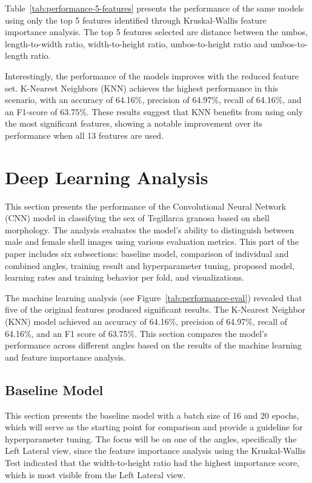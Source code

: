 Table~\ref{tab:performance-5-features} presents the performance of the same models using only the top 5 features identified through Kruskal-Wallis feature importance analysis. The top 5 features selected are distance between the umbos, length-to-width ratio, width-to-height ratio, umbos-to-height ratio and umbos-to-length ratio. 

Interestingly, the performance of the models improves with the reduced feature set. K-Nearest Neighbors (KNN) achieves the highest performance in this scenario, with an accuracy of 64.16\%, precision of 64.97\%, recall of 64.16\%, and an F1-score of 63.75\%. These results suggest that KNN benefits from using only the most significant features, showing a notable improvement over its performance when all 13 features are used. 

\section{Deep Learning Analysis}
This section presents the performance of the Convolutional Neural Network (CNN) model in classifying the sex of Tegillarca granosa based on shell morphology. The analysis evaluates the model's ability to distinguish between male and female shell images using various evaluation metrics. This part of the paper includes six subsections: baseline model, comparison of individual and combined angles, training result and hyperparameter tuning, proposed model, learning rates and training behavior per fold, and visualizations.

The machine learning analysis (see Figure~\ref{tab:performance-eval}) revealed that five of the original features produced significant results. The K-Nearest Neighbor (KNN) model achieved an accuracy of 64.16\%, precision of 64.97\%, recall of 64.16\%, and an F1 score of 63.75\%. This section compares the model's performance across different angles based on the results of the machine learning and feature importance analysis.

\subsection{Baseline Model}
This section presents the baseline model with a batch size of 16 and 20 epochs, which will serve as the starting point for comparison and provide a guideline for hyperparameter tuning. The focus will be on one of the angles, specifically the Left Lateral view, since the feature importance analysis using the Kruskal-Wallis Test indicated that the width-to-height ratio had the highest importance score, which is most visible from the Left Lateral view.

